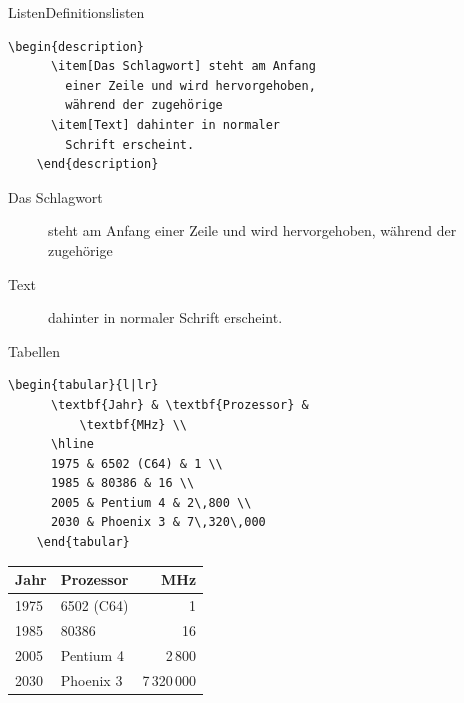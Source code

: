 \begin{Frame}[fragile]{Listen}{Definitionslisten}
  \begin{lstlisting}[gobble=4]
    \begin{description}
      \item[Das Schlagwort] steht am Anfang
        einer Zeile und wird hervorgehoben,
        während der zugehörige
      \item[Text] dahinter in normaler
        Schrift erscheint.
    \end{description}
  \end{lstlisting}

  \begin{description}
    \item[Das Schlagwort] steht am Anfang einer Zeile und wird
      hervorgehoben, während der zugehörige
    \item[Text] dahinter in normaler Schrift erscheint.
  \end{description}
\end{Frame}

\begin{Frame}[fragile]{Tabellen}
  \begin{lstlisting}[gobble=4]
    \begin{tabular}{l|lr}
      \textbf{Jahr} & \textbf{Prozessor} &
          \textbf{MHz} \\
      \hline
      1975 & 6502 (C64) & 1 \\
      1985 & 80386 & 16 \\
      2005 & Pentium 4 & 2\,800 \\
      2030 & Phoenix 3 & 7\,320\,000
    \end{tabular}
  \end{lstlisting}

  \begin{center}
    \begin{tabular}{l|lr}
      \textbf{Jahr} & \textbf{Prozessor} &
          \textbf{MHz} \\
      \hline
      1975 & 6502 (C64) & 1 \\
      1985 & 80386 & 16 \\
      2005 & Pentium 4 & 2\,800 \\
      2030 & Phoenix 3 & 7\,320\,000
    \end{tabular}
  \end{center}
\end{Frame}


